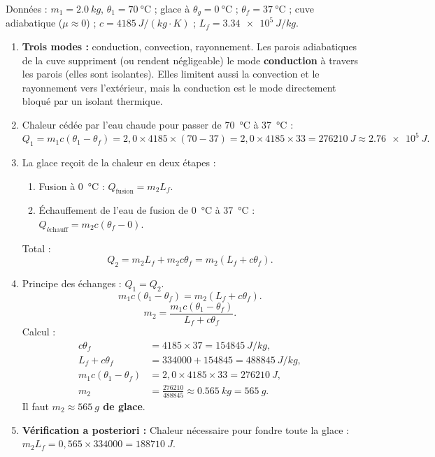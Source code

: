 \documentclass[11pt]{article}
\begin{document}
\begin{corrige}
Données : $m_1 = \SI{2,0}{kg}$, $\theta_1 = \SI{70}{\degreeCelsius}$ ; glace à $\theta_g = \SI{0}{\degreeCelsius}$ ; $\theta_f = \SI{37}{\degreeCelsius}$ ; cuve adiabatique ($\mu \approx 0$) ; $c = \SI{4185}{J/(kg\cdot K)}$ ; $L_f = \SI{3,34e5}{J/kg}$.
\begin{enumerate}
\item \textbf{Trois modes :} conduction, convection, rayonnement.
  Les parois adiabatiques de la cuve suppriment (ou rendent négligeable) le mode \textbf{conduction} à travers les parois (elles sont isolantes). Elles limitent aussi la convection et le rayonnement vers l'extérieur, mais la conduction est le mode directement bloqué par un isolant thermique.
\item Chaleur cédée par l'eau chaude pour passer de \SI{70}{\degreeCelsius} à \SI{37}{\degreeCelsius} :
  \[
  Q_1 = m_1 c (\theta_1 - \theta_f) = 2,0 \times 4185 \times (70 - 37) = 2,0 \times 4185 \times 33 = \SI{276210}{J} \approx \SI{2,76e5}{J}.
  \]
\item La glace reçoit de la chaleur en deux étapes :
  \begin{enumerate}
  \item Fusion à \SI{0}{\degreeCelsius} : $Q_{\text{fusion}} = m_2 L_f$.
  \item Échauffement de l'eau de fusion de \SI{0}{\degreeCelsius} à \SI{37}{\degreeCelsius} : $Q_{\text{échauff}} = m_2 c (\theta_f - 0)$.
  \end{enumerate}
  Total :
  \[
  Q_2 = m_2 L_f + m_2 c \theta_f = m_2 (L_f + c \theta_f).
  \]
\item Principe des échanges : $Q_1 = Q_2$.
  \[
  m_1 c (\theta_1 - \theta_f) = m_2 (L_f + c \theta_f).
  \]
  \[
  m_2 = \frac{m_1 c (\theta_1 - \theta_f)}{L_f + c \theta_f}.
  \]
  Calcul :
  \begin{align*}
  c \theta_f &= 4185 \times 37 = \SI{154845}{J/kg}, \\
  L_f + c \theta_f &= 334000 + 154845 = \SI{488845}{J/kg}, \\
  m_1 c (\theta_1 - \theta_f) &= 2,0 \times 4185 \times 33 = \SI{276210}{J}, \\
  m_2 &= \frac{276210}{488845} \approx \SI{0,565}{kg} = \SI{565}{g}.
  \end{align*}
  Il faut \textbf{$m_2 \approx \SI{565}{g}$ de glace}.
\item \textbf{Vérification a posteriori :}
  Chaleur nécessaire pour fondre toute la glace : $m_2 L_f = 0,565 \times 334000 = \SI{188710}{J}$.

\end{enumerate}
\end{corrige}
\end{document}
